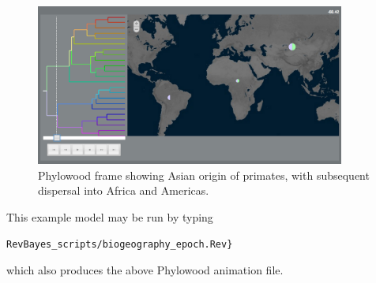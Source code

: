 \begin{figure}[H]
\centering
\includegraphics[width=4in]{figures/bg_2_epoch}
\caption{Phylowood frame showing Asian origin of primates, with subsequent dispersal into Africa and Americas.}
\end{figure}


This example model may be run by typing

\begin{snugshade}
\begin{lstlisting}
RevBayes_scripts/biogeography_epoch.Rev}
\end{lstlisting}
\end{snugshade}

which also produces the above Phylowood animation file.
